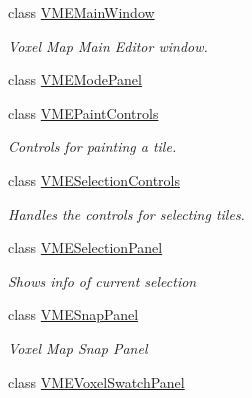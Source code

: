 \begin{DoxyCompactItemize}
class \hyperlink{class_v_m_e_1_1_v_m_e_main_window}{V\+M\+E\+Main\+Window}
\begin{DoxyCompactList}\small\item\em Voxel Map Main Editor window. \end{DoxyCompactList}\item 
class \hyperlink{class_v_m_e_1_1_v_m_e_mode_panel}{V\+M\+E\+Mode\+Panel}
\item 
class \hyperlink{class_v_m_e_1_1_v_m_e_paint_controls}{V\+M\+E\+Paint\+Controls}
\begin{DoxyCompactList}\small\item\em Controls for painting a tile. \end{DoxyCompactList}\item 
class \hyperlink{class_v_m_e_1_1_v_m_e_selection_controls}{V\+M\+E\+Selection\+Controls}
\begin{DoxyCompactList}\small\item\em Handles the controls for selecting tiles. \end{DoxyCompactList}\item 
class \hyperlink{class_v_m_e_1_1_v_m_e_selection_panel}{V\+M\+E\+Selection\+Panel}
\begin{DoxyCompactList}\small\item\em Shows info of current selection \end{DoxyCompactList}\item 
class \hyperlink{class_v_m_e_1_1_v_m_e_snap_panel}{V\+M\+E\+Snap\+Panel}
\begin{DoxyCompactList}\small\item\em Voxel Map Snap Panel \end{DoxyCompactList}\item 
class \hyperlink{class_v_m_e_1_1_v_m_e_voxel_swatch_panel}{V\+M\+E\+Voxel\+Swatch\+Panel}
\end{DoxyCompactItemize}
